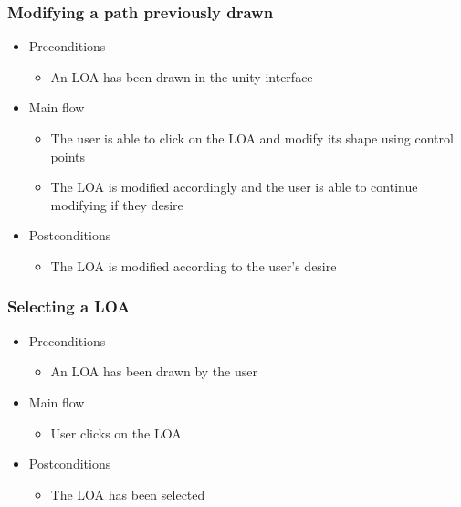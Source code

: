 \subsubsection{Modifying a path previously drawn}
    \begin{itemize}
    \item Preconditions
        \begin{itemize}
            \item An LOA has been drawn in the unity interface
        \end{itemize}
    \end{itemize}
    \begin{itemize}
        \item Main flow
        \begin{itemize}
            \item The user is able to click on the LOA and modify its shape using control points
            \item The LOA is modified accordingly and the user is able to continue modifying if they desire
        \end{itemize}
    \end{itemize}
    \begin{itemize}
        \item Postconditions
        \begin{itemize}
            \item The LOA is modified according to the user’s desire
        \end{itemize}
    \end{itemize}

\subsubsection{Selecting a LOA}
    \begin{itemize}
    \item Preconditions
        \begin{itemize}
            \item An LOA has been drawn by the user
        \end{itemize}
    \end{itemize}
    \begin{itemize}
        \item Main flow
        \begin{itemize}
            \item User clicks on the LOA
        \end{itemize}
    \end{itemize}
    \begin{itemize}
        \item Postconditions
        \begin{itemize}
            \item The LOA has been selected
        \end{itemize}
    \end{itemize}

